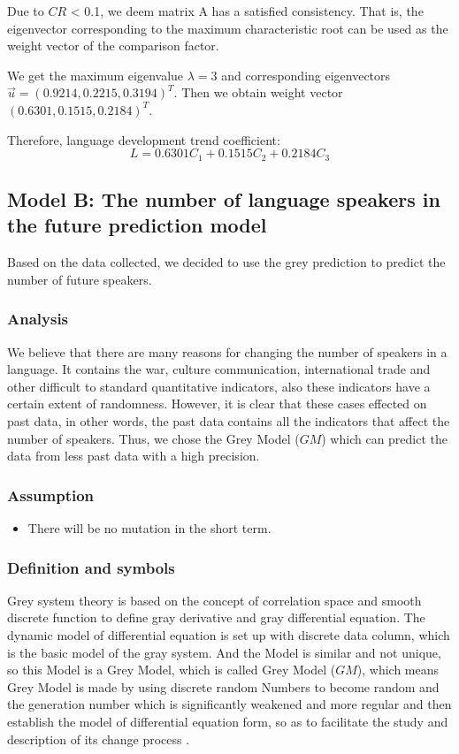 \documentclass{mcmthesis}
\begin{document}
Due to $CR$ < 0.1, we deem matrix A has a satisfied consistency. That is, the eigenvector corresponding to the maximum characteristic root can be used as the weight vector of the comparison factor.

We get the maximum eigenvalue $\lambda = 3$ and corresponding eigenvectors $\vec u = (0.9214, 0.2215, 0.3194)^T$. Then we obtain weight vector $(0.6301, 0.1515, 0.2184)^T$.

Therefore, language development trend coefficient:
$$L = 0.6301C_1 + 0.1515C_2 + 0.2184C_3$$

\subsection{Model B: The number of language speakers in the future prediction model}
Based on the data collected, we decided to use the grey prediction to predict the number of future speakers.

\subsubsection{Analysis}
We believe that there are many reasons for changing the number of speakers in a language. It contains the war, culture communication, international trade and other difficult to standard quantitative indicators, also these indicators have a certain extent of randomness. However, it is clear that these cases effected on past data, in other words, the past data contains all the indicators that affect the number of speakers. Thus, we chose the Grey Model ($GM$) which can predict the data from less past data with a high precision.

\subsubsection{Assumption}
\begin{itemize}
\item There will be no mutation in the short term.
\end{itemize}

\subsubsection{Definition and symbols}
Grey system theory is based on the concept of correlation space and smooth discrete function to define gray derivative and gray differential equation. The dynamic model of differential equation is set up with discrete data column, which is the basic model of the gray system. And the Model is similar and not unique, so this Model is a Grey Model, which is called Grey Model ($GM$), which means Grey Model is made by using discrete random Numbers to become random and the generation number which is significantly weakened and more regular and then establish the model of differential equation form, so as to facilitate the study and description of its change process \cite{5}.
\end{document}
